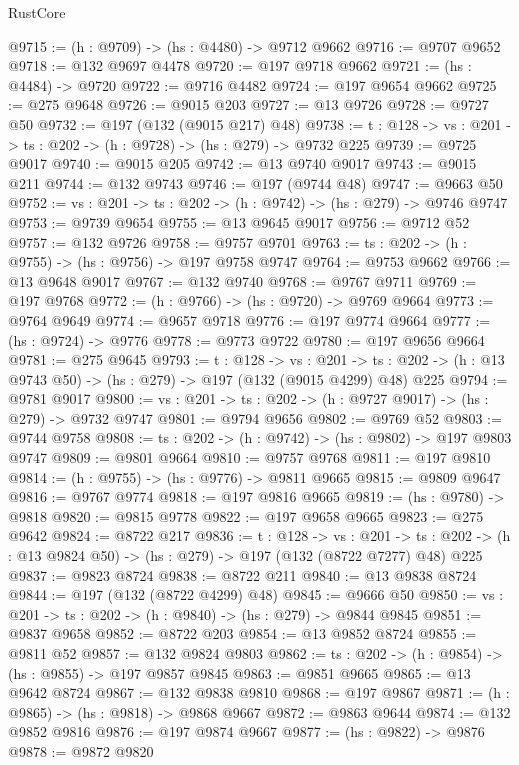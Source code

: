 \begin{lexlean}{RustCore}
\begin{coremodule}
@9715 := (h : @9709) -> (hs : @4480) -> @9712 @9662
@9716 := @9707 @9652
@9718 := @132 @9697 @4478
@9720 := @197 @9718 @9662
@9721 := (hs : @4484) -> @9720
@9722 := @9716 @4482
@9724 := @197 @9654 @9662
@9725 := @275 @9648
@9726 := @9015 @203
@9727 := @13 @9726
@9728 := @9727 @50
@9732 := @197 (@132 (@9015 @217) @48)
@9738 := {t : @128} -> {vs : @201} -> {ts : @202} -> (h : @9728) -> (hs : @279) -> @9732 @225
@9739 := @9725 @9017
@9740 := @9015 @205
@9742 := @13 @9740 @9017
@9743 := @9015 @211
@9744 := @132 @9743
@9746 := @197 (@9744 @48)
@9747 := @9663 @50
@9752 := {vs : @201} -> {ts : @202} -> (h : @9742) -> (hs : @279) -> @9746 @9747
@9753 := @9739 @9654
@9755 := @13 @9645 @9017
@9756 := @9712 @52
@9757 := @132 @9726
@9758 := @9757 @9701
@9763 := {ts : @202} -> (h : @9755) -> (hs : @9756) -> @197 @9758 @9747
@9764 := @9753 @9662
@9766 := @13 @9648 @9017
@9767 := @132 @9740
@9768 := @9767 @9711
@9769 := @197 @9768
@9772 := (h : @9766) -> (hs : @9720) -> @9769 @9664
@9773 := @9764 @9649
@9774 := @9657 @9718
@9776 := @197 @9774 @9664
@9777 := (hs : @9724) -> @9776
@9778 := @9773 @9722
@9780 := @197 @9656 @9664
@9781 := @275 @9645
@9793 := {t : @128} ->
  {vs : @201} ->
  {ts : @202} -> (h : @13 @9743 @50) -> (hs : @279) -> @197 (@132 (@9015 @4299) @48) @225
@9794 := @9781 @9017
@9800 := {vs : @201} -> {ts : @202} -> (h : @9727 @9017) -> (hs : @279) -> @9732 @9747
@9801 := @9794 @9656
@9802 := @9769 @52
@9803 := @9744 @9758
@9808 := {ts : @202} -> (h : @9742) -> (hs : @9802) -> @197 @9803 @9747
@9809 := @9801 @9664
@9810 := @9757 @9768
@9811 := @197 @9810
@9814 := (h : @9755) -> (hs : @9776) -> @9811 @9665
@9815 := @9809 @9647
@9816 := @9767 @9774
@9818 := @197 @9816 @9665
@9819 := (hs : @9780) -> @9818
@9820 := @9815 @9778
@9822 := @197 @9658 @9665
@9823 := @275 @9642
@9824 := @8722 @217
@9836 := {t : @128} ->
  {vs : @201} ->
  {ts : @202} -> (h : @13 @9824 @50) -> (hs : @279) -> @197 (@132 (@8722 @7277) @48) @225
@9837 := @9823 @8724
@9838 := @8722 @211
@9840 := @13 @9838 @8724
@9844 := @197 (@132 (@8722 @4299) @48)
@9845 := @9666 @50
@9850 := {vs : @201} -> {ts : @202} -> (h : @9840) -> (hs : @279) -> @9844 @9845
@9851 := @9837 @9658
@9852 := @8722 @203
@9854 := @13 @9852 @8724
@9855 := @9811 @52
@9857 := @132 @9824 @9803
@9862 := {ts : @202} -> (h : @9854) -> (hs : @9855) -> @197 @9857 @9845
@9863 := @9851 @9665
@9865 := @13 @9642 @8724
@9867 := @132 @9838 @9810
@9868 := @197 @9867
@9871 := (h : @9865) -> (hs : @9818) -> @9868 @9667
@9872 := @9863 @9644
@9874 := @132 @9852 @9816
@9876 := @197 @9874 @9667
@9877 := (hs : @9822) -> @9876
@9878 := @9872 @9820

\end{coremodule}
\end{lexlean}
